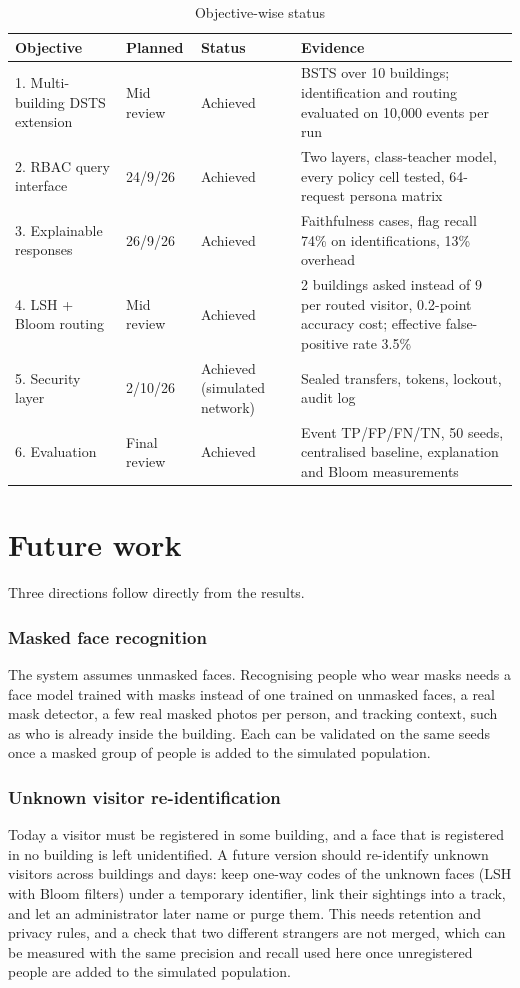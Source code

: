 \documentclass[12pt,a4paper,oneside]{report}
\begin{document}
\begin{table}[htbp]
\centering
\caption{Objective-wise status}\label{tab:status}
{\small\setlength{\tabcolsep}{4pt}\renewcommand{\arraystretch}{1.2}
\begin{tabular}{|p{4.3cm}|p{2.0cm}|p{2.6cm}|p{5.0cm}|}\hline
\textbf{Objective} & \textbf{Planned} & \textbf{Status} & \textbf{Evidence}\\\hline
1. Multi-building DSTS extension & Mid review & Achieved & BSTS over 10 buildings; identification and routing evaluated on 10,000 events per run\\\hline
2. RBAC query interface & 24/9/26 & Achieved & Two layers, class-teacher model, every policy cell tested, 64-request persona matrix\\\hline
3. Explainable responses & 26/9/26 & Achieved & Faithfulness cases, flag recall 74\% on identifications, 13\% overhead\\\hline
4. LSH + Bloom routing & Mid review & Achieved & 2 buildings asked instead of 9 per routed visitor, 0.2-point accuracy cost; effective false-positive rate 3.5\%\\\hline
5. Security layer & 2/10/26 & Achieved (simulated network) & Sealed transfers, tokens, lockout, audit log\\\hline
6. Evaluation & Final review & Achieved & Event TP/FP/FN/TN, 50 seeds, centralised baseline, explanation and Bloom measurements\\\hline
\end{tabular}}
\end{table}

\section{Future work}
Three directions follow directly from the results.

\subsubsection{Masked face recognition}
The system assumes unmasked faces. Recognising people who wear masks needs a face model trained with masks instead of one trained on unmasked faces, a real mask detector, a few real masked photos per person, and tracking context, such as who is already inside the building. Each can be validated on the same seeds once a masked group of people is added to the simulated population.

\subsubsection{Unknown visitor re-identification}
Today a visitor must be registered in some building, and a face that is registered in no building is left unidentified. A future version should re-identify unknown visitors across buildings and days: keep one-way codes of the unknown faces (LSH with Bloom filters) under a temporary identifier, link their sightings into a track, and let an administrator later name or purge them. This needs retention and privacy rules, and a check that two different strangers are not merged, which can be measured with the same precision and recall used here once unregistered people are added to the simulated population.
\end{document}
